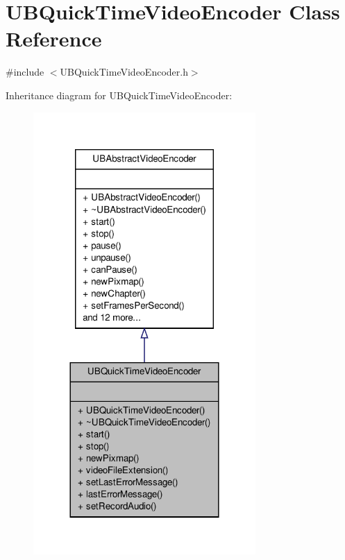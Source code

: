 \hypertarget{class_u_b_quick_time_video_encoder}{\section{U\-B\-Quick\-Time\-Video\-Encoder Class Reference}
\label{d1/dae/class_u_b_quick_time_video_encoder}
}


{\ttfamily \#include $<$U\-B\-Quick\-Time\-Video\-Encoder.\-h$>$}



Inheritance diagram for U\-B\-Quick\-Time\-Video\-Encoder\-:
\nopagebreak
\begin{figure}[H]
\begin{center}
\leavevmode
\includegraphics[width=240pt]{d7/d75/class_u_b_quick_time_video_encoder__inherit__graph}
\end{center}
\end{figure}


